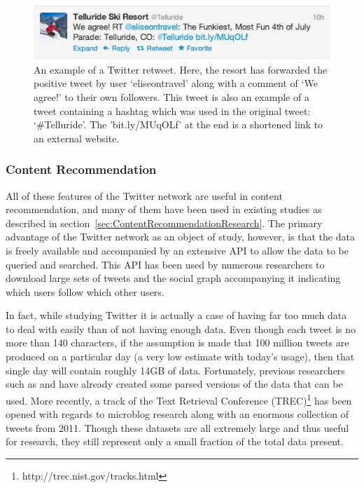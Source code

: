 \begin{figure}
  \centering
  \includegraphics[width=1\textwidth]{retweet_hashtag_example_figure}
  \caption[Example of a Twitter retweet and hashtag]{An example of a Twitter retweet. Here, the resort has forwarded the positive tweet by user `eliseontravel' along with a comment of `We agree!' to their own followers. This tweet is also an example of a tweet containing a hashtag which was used in the original tweet: `\#Telluride'. The 'bit.ly/MUqOLf' at the end is a shortened link to an external website.}
\label{fig:retweet_hashtag}
\end{figure}


\subsubsection{Content Recommendation}

All of these features of the Twitter network are useful in content recommendation, and many of them have been used in existing studies as described in section~\ref{sec:ContentRecommendationResearch}. The primary advantage of the Twitter network as an object of study, however, is that the data is freely available and accompanied by an extensive API to allow the data to be queried and searched. This API has been used by numerous researchers to download large sets of tweets and the social graph accompanying it indicating which users follow which other users.

In fact, while studying Twitter it is actually a case of having far too much data to deal with easily than of not having enough data. Even though each tweet is no more than 140 characters, if the assumption is made that 100 million tweets are produced on a particular day (a very low estimate with today's usage), then that single day will contain roughly 14GB of data. Fortunately, previous researchers such as \cite{Kwak2010} and \cite{Choudhury2010} have already created some parsed versions of the data that can be used. More recently, a track of the Text Retrieval Conference (TREC)\footnote{http://trec.nist.gov/tracks.html} has been opened with regards to microblog research along with an enormous collection of tweets from 2011. Though these datasets are all extremely large and thus useful for research, they still represent only a small fraction of the total data present.

